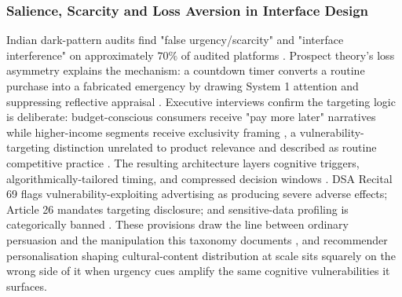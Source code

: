 \documentclass[11pt]{article}
\begin{document}
\subsubsection{Salience, Scarcity and Loss Aversion in Interface Design}
\label{sec:salience_scarcity_loss_aversion} Indian dark-pattern audits find "false urgency/scarcity" and "interface interference" on approximately $70\%$ of audited platforms \parencites[8]{6295677}. Prospect theory's loss asymmetry explains the mechanism: a countdown timer converts a routine purchase into a fabricated emergency by drawing System 1 attention and suppressing reflective appraisal \parencites[135]{8745065}[136]{8745065}. Executive interviews confirm the targeting logic is deliberate: budget-conscious consumers receive "pay more later" narratives while higher-income segments receive exclusivity framing \parencites[138]{8745065}, a vulnerability-targeting distinction unrelated to product relevance and described as routine competitive practice \parencites[135]{8745065}. The resulting architecture layers cognitive triggers, algorithmically-tailored timing, and compressed decision windows \parencites[139]{8745065}. DSA Recital 69 flags vulnerability-exploiting advertising as producing severe adverse effects; Article 26 mandates targeting disclosure; and sensitive-data profiling is categorically banned \parencites[18]{6941611}. These provisions draw the line between ordinary persuasion and the manipulation this taxonomy documents \parencites[12]{6295677}[390]{7896734}, and recommender personalisation shaping cultural-content distribution at scale \parencites[3]{5403359} sits squarely on the wrong side of it when urgency cues amplify the same cognitive vulnerabilities it surfaces.
\end{document}
